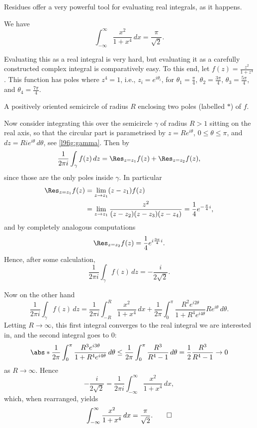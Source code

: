 


Residues offer a very powerful tool for evaluating real integrals, as it happens.

\begin{example}
	We have
	\[
		\int_{-\infty}^\infty \frac{x^2}{1 + x^4} \, d x = \frac{\pi}{\sqrt{2}}.
	\]

	Evaluating this as a real integral is very hard, but evaluating it as a carefully constructed complex integral is comparatively easy.
	To this end, let $f(z) = \frac{z^2}{1 + z^4}$.
	This function has poles where $z^4 = 1$, i.e., $z_i = e^{i \theta_i}$, for $\theta_1 = \frac{\pi}{4}$, $\theta_2 = \frac{3 \pi}{4}$, $\theta_3 = \frac{5 \pi}{4}$, and $\theta_4 = \frac{7 \pi}{4}$.

	\begin{marginfigure}

		\caption{\label{l9fig:gamma} A positively oriented semicircle of radius $R$ enclosing two poles (labelled $*$) of $f$.}
	\end{marginfigure}

	Now consider integrating this over the semicircle $\gamma$ of radius $R > 1$ sitting on the real axis, so that the circular part is parametrised by $z = R e^{i \theta}$, $0 \leq \theta \leq \pi$, and $d z = R i e^{i \theta} \, d \theta$, see \autoref{l9fig:gamma}.
	Then by 
	\[
		\frac{1}{2 \pi i} \int_\gamma f(z) \, d z = \Res_{z = z_1} f(z) + \Res_{z = z_2} f(z),
	\]
	since those are the only poles inside $\gamma$.
	In particular
	\begin{align*}
		\Res_{z = z_1} f(z) &= \lim_{z \to z_1} (z - z_1) f(z) \\
		&= \lim_{z \to z_1} \frac{z^2}{(z - z_2) (z - z_3) (z - z_4)} = \frac{1}{4} e^{- \frac{\pi}{4} i},
	\end{align*}
	and by completely analogous computations
	\[
		\Res_{z = z_2} f(z) = \frac{1}{4} e^{i \frac{3 \pi}{4} i}.
	\]
	Hence, after some calculation,
	\[
		\frac{1}{2 \pi i} \int_\gamma f(z) \, d z = - \frac{i}{2 \sqrt{2}}.
	\]

	Now on the other hand
	\[
		\frac{1}{2 \pi i} \int_\gamma f(z) \, d z = \frac{1}{2 \pi i} \int_{-R}^R \frac{x^2}{1 + x^4} \, d x + \frac{1}{2 \pi} \int_0^\pi \frac{R^2 e^{i 2 \theta}}{1 + R^4 e^{i 4 \theta}} R e^{i \theta} \, d \theta.
	\]
	Letting $R \to \infty$, this first integral converges to the real integral we are interested in, and the second integral goes to $0$:
	\[
		\abs*{\frac{1}{2 \pi} \int_0^\pi \frac{R^3 e^{i 3 \theta}}{1 + R^4 e^{i 4 \theta}} \, d \theta} \leq \frac{1}{2 \pi} \int_0^\pi \frac{R^3}{R^4 - 1} \, d \theta = \frac{1}{2} \frac{R^3}{R^4 - 1} \to 0
	\]
	as $R \to \infty$.
	Hence
	\[
		- \frac{i}{2 \sqrt{2}} = \frac{1}{2 \pi i} \int_{-\infty}^\infty \frac{x^2}{1 + x^4} \, d x,
	\]
	which, when rearranged, yields
	\[
		\int_{-\infty}^\infty \frac{x^2}{1 + x^4} \, d x = \frac{\pi}{\sqrt{2}}. \qedhere
	\]
\end{example}

